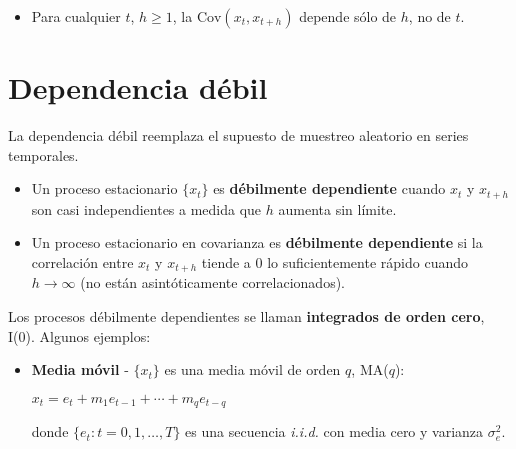 \documentclass[10pt, a4paper, landscape]{article}
\newcommand{\E}{\mathrm{E}}
\newcommand{\Var}{\mathrm{Var}}
\newcommand{\Cov}{\mathrm{Cov}}
\begin{document}
\begin{multicols}{3}
\begin{itemize}[leftmargin=*]
			\begin{itemize}[leftmargin=*]
				
				\item Para cualquier $t$, $h \geq 1$, la $\Cov(x_{t}, x_{t + h})$ depende sólo de $h$, no de $t$.
			\end{itemize}
		\end{itemize}
		
		\section*{Dependencia débil}
		
		La dependencia débil reemplaza el supuesto de muestreo aleatorio en series temporales.
		
		\begin{itemize}[leftmargin=*]
			\item Un proceso estacionario $\lbrace x_{t} \rbrace$ es \textbf{débilmente dependiente} cuando $x_{t}$ y $x_{t + h}$ son casi independientes a medida que $h$ aumenta sin límite.
			\item Un proceso estacionario en covarianza es \textbf{débilmente dependiente} si la correlación entre $x_{t}$ y $x_{t + h}$ tiende a $0$ lo suficientemente rápido cuando $h \rightarrow \infty$ (no están asintóticamente correlacionados).
		\end{itemize}
		
		Los procesos débilmente dependientes se llaman \textbf{integrados de orden cero}, I(0). Algunos ejemplos:
		
		\begin{itemize}[leftmargin=*]
			\item \textbf{Media móvil} - $\lbrace x_{t} \rbrace$ es una media móvil de orden $q$, MA($q$):
			
			\begin{center}
				$x_{t} = e_{t} + m_{1} e_{t - 1} + \cdots + m_{q} e_{t - q}$
			\end{center}
			
			donde $\lbrace e_{t} : t = 0, 1, \ldots, T \rbrace$ es una secuencia \textsl{i.i.d.} con media cero y varianza $\sigma^{2}_{e}$.
			

\end{itemize}
\end{multicols}
\end{document}
